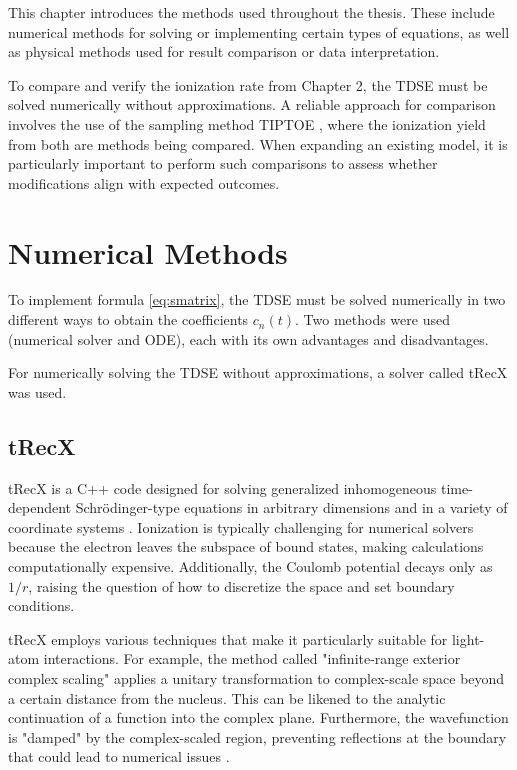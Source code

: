 This chapter introduces the methods used throughout the thesis.
These include numerical methods for solving or implementing certain types of equations, as well as physical methods used for result comparison or data interpretation.


To compare and verify the ionization rate from Chapter 2, the TDSE must be solved numerically without approximations.
A reliable approach for comparison involves the use of the sampling method TIPTOE \cite{Park:18}, where the ionization yield from both are methods being compared.
When expanding an existing model, it is particularly important to perform such comparisons to assess whether modifications align with expected outcomes.

\section{Numerical Methods}
To implement formula \ref{eq:smatrix}, the TDSE must be solved numerically in two different ways to obtain the coefficients $c_n(t)$.  
Two methods were used (numerical solver and ODE), each with its own advantages and disadvantages.  

For numerically solving the TDSE without approximations, a solver called tRecX was used.  


\subsection{tRecX}
tRecX is a C++ code designed for solving generalized inhomogeneous time-dependent Schrödinger-type equations in arbitrary dimensions and in a variety of coordinate systems \cite{Scrinzi_trecx}.
Ionization is typically challenging for numerical solvers because the electron leaves the subspace of bound states, making calculations computationally expensive.
Additionally, the Coulomb potential decays only as $1/r$, raising the question of how to discretize the space and set boundary conditions.

tRecX employs various techniques that make it particularly suitable for light-atom interactions.
For example, the method called "infinite-range exterior complex scaling" applies a unitary transformation to complex-scale space beyond a certain distance from the nucleus.
This can be likened to the analytic continuation of a function into the complex plane.
Furthermore, the wavefunction is "damped" by the complex-scaled region, preventing reflections at the boundary that could lead to numerical issues \cite{scrinzi_irecs}.

